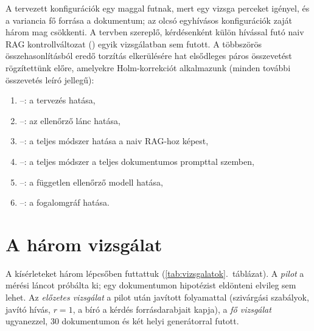A tervezett konfigurációk egy maggal futnak, mert egy vizsga perceket igényel, és a variancia fő forrása
a dokumentum; az olcsó egyhívásos konfigurációk zaját három mag csökkenti. A tervben szereplő, kérdésenként külön hívással futó naiv RAG kontrollváltozat ()
egyik vizsgálatban sem futott. A többszörös összehasonlításból eredő torzítás elkerülésére hat elsődleges
páros összevetést rögzítettünk előre, amelyekre Holm-korrekciót alkalmazunk (minden további összevetés
leíró jellegű):
\begin{enumerate}[label=(\arabic*),leftmargin=*,itemsep=1pt,topsep=2pt]
\item {}--: a tervezés hatása,
\item {}--: az ellenőrző lánc hatása,
\item {}--: a teljes módszer hatása a naiv RAG-hoz képest,
\item {}--: a teljes módszer a teljes dokumentumos prompttal szemben,
\item {}--: a független ellenőrző modell hatása,
\item {}--: a fogalomgráf hatása.
\end{enumerate}

\section{A három vizsgálat}
\label{sec:vizsgalatok}

A kísérleteket három lépcsőben futtattuk (\ref{tab:vizsgalatok}.~táblázat). A \emph{pilot} a mérési
láncot próbálta ki; egy dokumentumon hipotézist eldönteni elvileg sem lehet. Az \emph{előzetes vizsgálat} a
pilot után javított folyamattal (szivárgási szabályok, javító hívás, $r=1$, a bíró a kérdés forrásdarabjait
kapja), a \emph{fő vizsgálat} ugyanezzel, 30 dokumentumon és két helyi generátorral futott.

